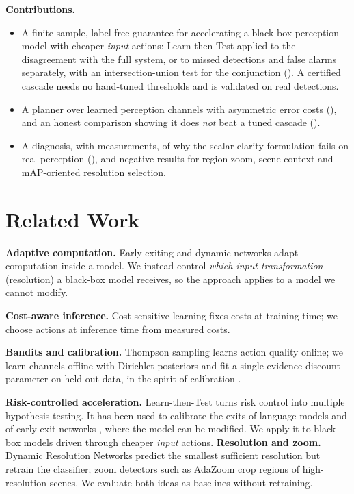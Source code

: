 \documentclass[11pt]{article}
\begin{document}
\textbf{Contributions.}
\begin{itemize}
  \item A finite-sample, label-free guarantee for accelerating a black-box perception model with
  cheaper \emph{input} actions: Learn-then-Test applied to the disagreement with the full system,
  or to missed detections and false alarms separately, with an intersection-union test for the
  conjunction (). A certified cascade needs no hand-tuned thresholds and is
  validated on real detections.
  \item A planner over learned perception channels with asymmetric error costs (),
  and an honest comparison showing it does \emph{not} beat a tuned cascade ().
  \item A diagnosis, with measurements, of why the scalar-clarity formulation fails on real perception
  (), and negative results for region zoom, scene context and mAP-oriented resolution
  selection.
\end{itemize}

\section{Related Work}
\label{sec:related}

\textbf{Adaptive computation.} Early exiting \cite{teerapakayan2021early} and dynamic networks
\cite{han2021deep} adapt computation inside a model. We instead control \emph{which input
transformation} (resolution) a black-box model receives, so the approach applies to a model we
cannot modify.

\textbf{Cost-aware inference.} Cost-sensitive learning \cite{zadrozny2003cost} fixes costs at
training time; we choose actions at inference time from measured costs.

\textbf{Bandits and calibration.} Thompson sampling \cite{thompson1933likelihood,russo2018tutorial}
learns action quality online; we learn channels offline with Dirichlet posteriors and fit a
single evidence-discount parameter on held-out data, in the spirit of calibration
\cite{guo2017calibration}.

\textbf{Risk-controlled acceleration.} Learn-then-Test \cite{angelopoulos2021learn} turns risk
control into multiple hypothesis testing. It has been used to calibrate the exits of language models
\cite{schuster2022confident} and of early-exit networks \cite{jazbec2024fast}, where the model can
be modified. We apply it to black-box models driven through cheaper \emph{input} actions.
\textbf{Resolution and zoom.} Dynamic Resolution Networks \cite{zhu2021dynamic} predict the
smallest sufficient resolution but retrain the classifier; zoom detectors such as AdaZoom
\cite{xu2021adazoom} crop regions of high-resolution scenes. We evaluate both ideas as baselines
without retraining.
\end{document}
